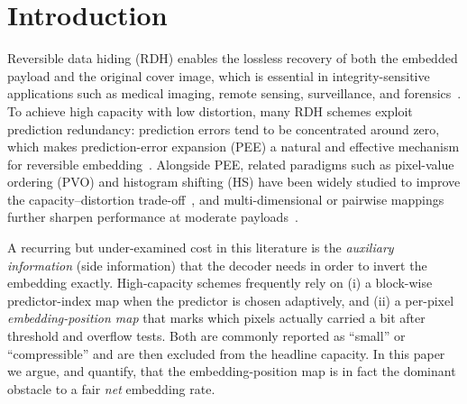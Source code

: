 \documentclass[journal,article,submit,pdftex,moreauthors]{Definitions/mdpi}
\begin{document}
%
%
\section{Introduction}

Reversible data hiding (RDH) enables the lossless recovery of both the embedded payload and the original cover image, which is essential in integrity-sensitive applications such as medical imaging, remote sensing, surveillance, and forensics~\cite{Ni2006,Li2015,ZhangSurvey2024}.
To achieve high capacity with low distortion, many RDH schemes exploit prediction redundancy: prediction errors tend to be concentrated around zero, which makes prediction-error expansion (PEE) a natural and effective mechanism for reversible embedding~\cite{Thodi2007,Li2011,Sachnev2009}.
Alongside PEE, related paradigms such as pixel-value ordering (PVO) and histogram shifting (HS) have been widely studied to improve the capacity--distortion trade-off~\cite{Gao2019,Rad2016,Soveiri2025,Ni2006,Fallahpour2007,Fu2014,Chang2022}, and multi-dimensional or pairwise mappings further sharpen performance at moderate payloads~\cite{Ou2013,Kim2019,Ou2019,Chang2022,Zhang2022}.

A recurring but under-examined cost in this literature is the \emph{auxiliary information} (side information) that the decoder needs in order to invert the embedding exactly. High-capacity schemes frequently rely on (i) a block-wise predictor-index map when the predictor is chosen adaptively, and (ii) a per-pixel \emph{embedding-position map} that marks which pixels actually carried a bit after threshold and overflow tests. Both are commonly reported as ``small'' or ``compressible'' and are then excluded from the headline capacity. In this paper we argue, and quantify, that the embedding-position map is in fact the dominant obstacle to a fair \emph{net} embedding rate.
\end{document}
